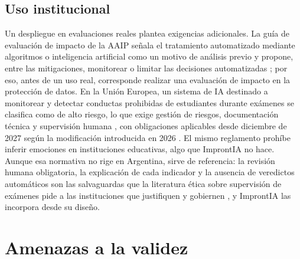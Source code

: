 \subsection{Uso institucional}

Un despliegue en evaluaciones reales plantea exigencias adicionales. La guía de evaluación de impacto de la AAIP señala el tratamiento automatizado mediante algoritmos o inteligencia artificial como un motivo de análisis previo y propone, entre las mitigaciones, monitorear o limitar las decisiones automatizadas \parencite{AAIP2020GuiaEIPD}; por eso, antes de un uso real, corresponde realizar una evaluación de impacto en la protección de datos. En la Unión Europea, un sistema de IA destinado a monitorear y detectar conductas prohibidas de estudiantes durante exámenes se clasifica como de alto riesgo, lo que exige gestión de riesgos, documentación técnica y supervisión humana \parencite{UE2024AIAct}, con obligaciones aplicables desde diciembre de 2027 según la modificación introducida en 2026 \parencite{UE2026AIOmnibus}. El mismo reglamento prohíbe inferir emociones en instituciones educativas, algo que ImprontIA no hace. Aunque esa normativa no rige en Argentina, sirve de referencia: la revisión humana obligatoria, la explicación de cada indicador y la ausencia de veredictos automáticos son las salvaguardas que la literatura ética sobre supervisión de exámenes pide a las instituciones que justifiquen y gobiernen \parencite{Coghlan2021}, y ImprontIA las incorpora desde su diseño.

\section{Amenazas a la validez}
\label{sec:eval_amenazas}

